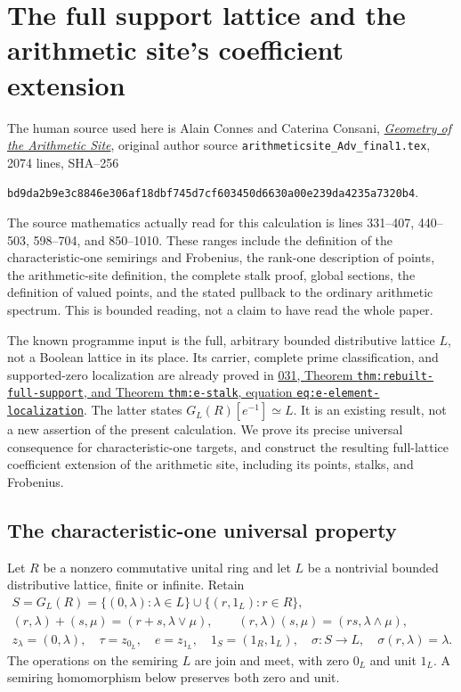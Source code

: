 \section{The full support lattice and the arithmetic site's coefficient extension}
\label{sec:arithmetic-site-lattice-map}

The human source used here is Alain Connes and Caterina Consani,
\href{https://arxiv.org/abs/1502.05580}{\emph{Geometry of the Arithmetic
Site}}, original author source \texttt{arithmeticsite\_Adv\_final1.tex},
2074 lines, SHA--256
\par\noindent
\texttt{bd9da2b9e3c8846e306af18dbf745d7cf603450d6630a00e239da4235a7320b4}.
\par\noindent
The source mathematics actually read for this calculation is lines
331--407, 440--503, 598--704, and 850--1010. These ranges include the
definition of the characteristic-one semirings and Frobenius,
the rank-one description of points, the arithmetic-site definition,
the complete stalk proof, global sections, the definition of valued
points, and the stated pullback to the ordinary arithmetic spectrum.
This is bounded reading, not a claim to have read the whole paper.

The known programme input is the full, arbitrary bounded distributive
lattice $L$, not a Boolean lattice in its place. Its carrier, complete
prime classification, and supported-zero localization are already proved
in
\href{https://github.com/KokunoYumeto/zeta-function-research-reader/blob/3c78cfbd9e194d35117b33277c421c6564ce3dbf/workbenches/splitzero-tandem/continuations/20260923-full-prime-support/031/01_REBUILT_MATHEMATICS.tex}{031,
Theorem \texttt{thm:rebuilt-full-support}, and Theorem
\texttt{thm:e-stalk}, equation \texttt{eq:e-element-localization}}.
The latter states $G_L(R)[e^{-1}]\simeq L$. It is an existing result,
not a new assertion of the present calculation. We prove its precise
universal consequence for characteristic-one targets, and construct
the resulting full-lattice coefficient extension of the arithmetic
site, including its points, stalks, and Frobenius.

\subsection{The characteristic-one universal property}

Let $R$ be a nonzero commutative unital ring and let $L$ be a nontrivial
bounded distributive lattice, finite or infinite. Retain
\begin{equation}\tag{ASL1}
 \begin{gathered}
 S=G_L(R)=\{(0,\lambda):\lambda\in L\}
                  \cup\{(r,1_L):r\in R\},\\
 (r,\lambda)+(s,\mu)=(r+s,\lambda\vee\mu),\qquad
 (r,\lambda)(s,\mu)=(rs,\lambda\wedge\mu),\\
 z_\lambda=(0,\lambda),\quad \tau=z_{0_L},\quad e=z_{1_L},
 \quad 1_S=(1_R,1_L),\quad
 \sigma:S\longrightarrow L,\quad \sigma(r,\lambda)=\lambda.
 \end{gathered}
\end{equation}
The operations on the semiring $L$ are join and meet, with zero $0_L$
and unit $1_L$. A semiring homomorphism below preserves both zero and
unit.

